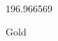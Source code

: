 \documentclass[12pt]{article}
\begin{document}
\hfill{}
\vfill
\begin{center}
  {\fontsize{50}{60}
  }

  196.966569

Gold
\end{center}
\vfill
\end{document}
